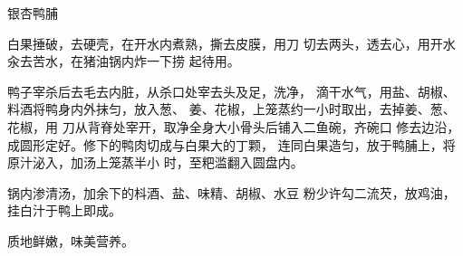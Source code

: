 \begin{recipe}{银杏鸭脯}

\ingredients



\cooking

\step 白果捶破，去硬壳，在开水内煮熟，撕去皮膜，用刀 切去两头，透去心，用开水汆去苦水，在猪油锅内炸一下捞 起待用。

\step 鸭子宰杀后去毛去内脏，从杀口处宰去头及足，洗净， 滴干水气，用盐、胡椒、料酒将鸭身内外抹匀，放入葱、 姜、花椒，上笼蒸约一小时取出，去掉姜、葱、花椒，用 刀从背脊处宰开，取净全身大小骨头后铺入二鱼碗，齐碗口 修去边沿，成圆形定好。修下的鸭肉切成与白果大的丁颗， 连同白果造匀，放于鸭脯上，将原汁泌入，加汤上笼蒸半小 时，至粑滥翻入圆盘内。

\step 锅内渗清汤，加余下的枓酒、盐、味精、胡椒、水豆 粉少许勾二流芡，放鸡油，挂白汁于鸭上即成。

\notes

质地鲜嫩，味美营养。

\end{recipe}

